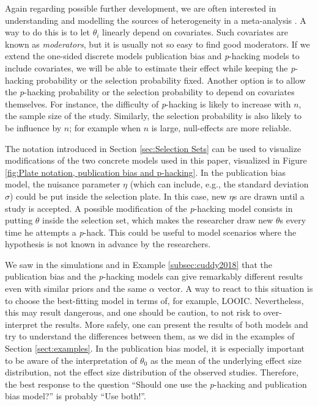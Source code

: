 \documentclass{article}
\theoremstyle{plain}
\theoremstyle{definition}
\begin{document}
Again regarding possible further development, we are often interested in understanding and modelling the sources of heterogeneity in a meta-analysis \citep{thompson1994systematic}. A way to do this is to let $\theta_{i}$ linearly depend on covariates. Such covariates are known as \emph{moderators}, but it is usually not so easy to find good moderators. If we extend the one-sided discrete models publication bias and \textit{p}-hacking models to include covariates, we will be able to estimate their effect while keeping the \textit{p}-hacking probability or the selection probability fixed. Another option is to allow the \textit{p}-hacking probability or the selection probability to depend on covariates themselves. For instance, the difficulty of \textit{p}-hacking is likely to increase with $n$, the sample size of the study. Similarly, the selection probability is also likely to be influence by $n$; for example when $n$ is large, null-effects are more reliable.

The notation introduced in Section \ref{sec:Selection Sets} can be used to visualize modifications of the two concrete models used in this paper, visualized in Figure \ref{fig:Plate notation, publication bias and p-hacking}. In the publication bias model, the nuisance parameter $\eta$ (which can include, e.g., the standard deviation $\sigma$) could be put inside the selection plate. In this case, new $\eta$s are drawn until a study is accepted. A possible modification of the \textit{p}-hacking model consists in putting $\theta$ inside the selection set, which makes the researcher draw new $\theta$s every time he attempts a \textit{p}-hack. This could be useful to model scenarios where the hypothesis is not
known in advance by the researchers.

We saw in the simulations and in Example \ref{subsec:cuddy2018} that the publication bias and the \textit{p}-hacking models can give remarkably different results even with similar priors and the same $\alpha$ vector. A way to react to this situation is to choose the best-fitting model in terms of, for example, LOOIC. Nevertheless, this may result dangerous, and one should be caution, to not risk to over-interpret the results. More safely, one can present the results of both models and try to understand the differences between them, as we did in the examples of Section \ref{sect:examples}. In the publication bias model, it is especially important to be aware of the interpretation of $\theta_{0}$ as the mean of the underlying effect size distribution, not the effect size distribution of the observed studies. Therefore, the best response to the question ``Should one use the \textit{p}-hacking and publication bias model?'' is probably ``Use both!''.
\end{document}
